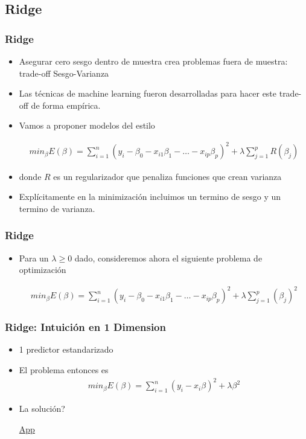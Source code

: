 \documentclass[
  shownotes,
  xcolor={svgnames},
  hyperref={colorlinks,citecolor=DarkBlue,linkcolor=andesred,urlcolor=DarkBlue}
  , aspectratio=169]{beamer}
\begin{document}
\subsection{Ridge}
\begin{frame}[fragile]
\frametitle{Ridge}
  \begin{itemize}
    \item Asegurar cero sesgo dentro de muestra crea problemas fuera de muestra: trade-off Sesgo-Varianza
    \medskip
    \item Las técnicas de machine learning fueron desarrolladas para hacer este trade-off de forma empírica.
    \medskip
    \item Vamos a proponer modelos del estilo


\begin{align}
min_{\beta} E(\beta) = \sum_{i=1}^n (y_i-\beta_0 - x_{i1}\beta_1 - \dots - x_{ip}\beta_p)^2 + \lambda \sum_{j=1}^p R(\beta_j)
\end{align}

\item donde $R$ es un regularizador que penaliza funciones que crean varianza
\medskip
\item Explícitamente en la minimización incluimos un termino de sesgo y un termino de varianza.


  \end{itemize}
\end{frame}
\begin{frame}[fragile]
\frametitle{Ridge}

\begin{itemize}
\item Para un $\lambda \geq 0$ dado, consideremos ahora el siguiente problema de optimización


\begin{align}
min_{\beta} E(\beta) = \sum_{i=1}^n (y_i-\beta_0 - x_{i1}\beta_1 - \dots - x_{ip}\beta_p)^2 + \lambda \sum_{j=1}^p (\beta_j)^2
\end{align}



\end{itemize}
\end{frame}
\begin{frame}[fragile]
\frametitle{Ridge: Intuición en 1 Dimension }

\begin{itemize}
\item 1 predictor estandarizado
\medskip
\item El problema entonces es 
\begin{align}
min_{\beta} E(\beta) = \sum_{i=1}^n (y_i- x_{i}\beta )^2 + \lambda \beta^2
\end{align}

\item La solución?

\vspace{2in}
\href{https://cede.uniandes.edu.co/OLS/}{App}
\end{itemize}
\end{frame}
\end{document}
